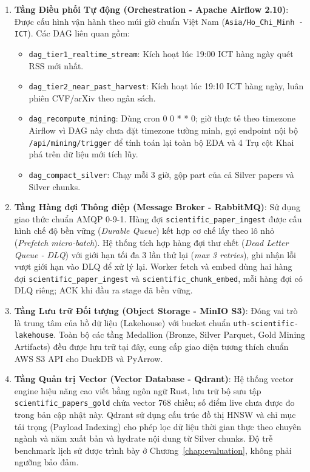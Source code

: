 \begin{enumerate}[label=\textbf{\arabic*.}]
  \item \textbf{Tầng Điều phối Tự động (Orchestration - Apache Airflow 2.10)}:
    Được cấu hình vận hành theo múi giờ chuẩn Việt Nam (\texttt{Asia/Ho\_Chi\_Minh - ICT}). Các DAG liên quan gồm:
    \begin{itemize}
      \item \texttt{dag\_tier1\_realtime\_stream}: Kích hoạt lúc 19:00 ICT hàng ngày quét RSS mới nhất.
      \item \texttt{dag\_tier2\_near\_past\_harvest}: Kích hoạt lúc 19:10 ICT hàng ngày, luân phiên CVF/arXiv theo ngân sách.
      \item \texttt{dag\_recompute\_mining}: Dùng cron 0 0 * * 0; giờ thực tế theo timezone Airflow vì DAG này chưa đặt timezone tường minh, gọi endpoint nội bộ \texttt{/api/mining/trigger} để tính toán lại toàn bộ EDA và 4 Trụ cột Khai phá trên dữ liệu mới tích lũy.
      \item \texttt{dag\_compact\_silver}: Chạy mỗi 3 giờ, gộp part của cả Silver papers và Silver chunks.
    \end{itemize}
  \item \textbf{Tầng Hàng đợi Thông điệp (Message Broker - RabbitMQ)}:
    Sử dụng giao thức chuẩn AMQP 0-9-1. Hàng đợi \texttt{scientific\_paper\_ingest} được cấu hình chế độ bền vững (\textit{Durable Queue}) kết hợp cơ chế lấy theo lô nhỏ (\textit{Prefetch micro-batch}). Hệ thống tích hợp hàng đợi thư chết (\textit{Dead Letter Queue - DLQ}) với giới hạn tối đa 3 lần thử lại (\textit{max 3 retries}), ghi nhận lỗi vượt giới hạn vào DLQ để xử lý lại. Worker fetch và embed dùng hai hàng đợi \texttt{scientific\_paper\_ingest} và \texttt{scientific\_chunk\_embed}, mỗi hàng đợi có DLQ riêng; ACK khi đầu ra stage đã bền vững.
  \item \textbf{Tầng Lưu trữ Đối tượng (Object Storage - MinIO S3)}:
    Đóng vai trò là trung tâm của hồ dữ liệu (Lakehouse) với bucket chuẩn \texttt{uth-scientific-lakehouse}. Toàn bộ các tầng Medallion (Bronze, Silver Parquet, Gold Mining Artifacts) đều được lưu trữ tại đây, cung cấp giao diện tương thích chuẩn AWS S3 API cho DuckDB và PyArrow.
  \item \textbf{Tầng Quản trị Vector (Vector Database - Qdrant)}:
    Hệ thống vector engine hiệu năng cao viết bằng ngôn ngữ Rust, lưu trữ bộ sưu tập \texttt{scientific\_papers\_gold} chứa vector 768 chiều; số điểm live chưa được đo trong bản cập nhật này. Qdrant sử dụng cấu trúc đồ thị HNSW và chỉ mục tải trọng (Payload Indexing) cho phép lọc dữ liệu thời gian thực theo chuyên ngành và năm xuất bản và hydrate nội dung từ Silver chunks. Độ trễ benchmark lịch sử được trình bày ở Chương~\ref{chap:evaluation}, không phải ngưỡng bảo đảm.

\end{enumerate}
